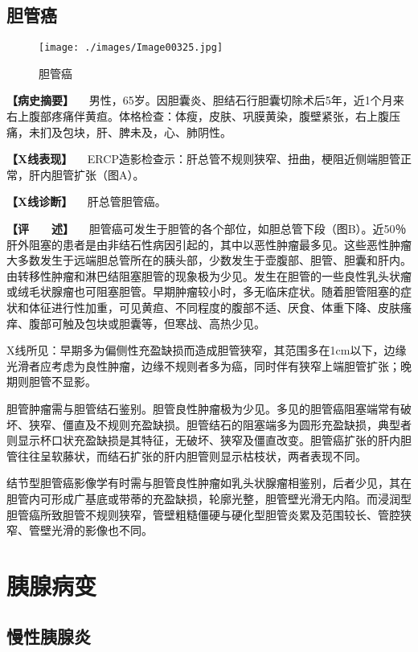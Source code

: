 \subsection{胆管癌}

\begin{figure}[!htbp]
 \centering
 \texttt{[image: ./images/Image00325.jpg]}
 \captionsetup{justification=centering}
 \caption{胆管癌}
 \label{fig5-8-6}
  \end{figure} 

\textbf{【病史摘要】}
　男性，65岁。因胆囊炎、胆结石行胆囊切除术后5年，近1个月来右上腹部疼痛伴黄疸。体格检查：体瘦，皮肤、巩膜黄染，腹壁紧张，右上腹压痛，未扪及包块，肝、脾未及，心、肺阴性。

\textbf{【X线表现】}
　ERCP造影检查示：肝总管不规则狭窄、扭曲，梗阻近侧端胆管正常，肝内胆管扩张（图A）。

\textbf{【X线诊断】} 　肝总管胆管癌。

\textbf{【评　　述】}
　胆管癌可发生于胆管的各个部位，如胆总管下段（图B）。近50％肝外阻塞的患者是由非结石性病因引起的，其中以恶性肿瘤最多见。这些恶性肿瘤大多数发生于远端胆总管所在的胰头部，少数发生于壶腹部、胆管、胆囊和肝内。由转移性肿瘤和淋巴结阻塞胆管的现象极为少见。发生在胆管的一些良性乳头状瘤或绒毛状腺瘤也可阻塞胆管。早期肿瘤较小时，多无临床症状。随着胆管阻塞的症状和体征进行性加重，可见黄疸、不同程度的腹部不适、厌食、体重下降、皮肤瘙痒、腹部可触及包块或胆囊等，但寒战、高热少见。

X线所见：早期多为偏侧性充盈缺损而造成胆管狭窄，其范围多在1cm以下，边缘光滑者应考虑为良性肿瘤，边缘不规则者多为癌，同时伴有狭窄上端胆管扩张；晚期则胆管不显影。

胆管肿瘤需与胆管结石鉴别。胆管良性肿瘤极为少见。多见的胆管癌阻塞端常有破坏、狭窄、僵直及不规则充盈缺损。胆管结石的阻塞端多为圆形充盈缺损，典型者则显示杯口状充盈缺损是其特征，无破坏、狭窄及僵直改变。胆管癌扩张的肝内胆管往往呈软藤状，而结石扩张的肝内胆管则显示枯枝状，两者表现不同。

结节型胆管癌影像学有时需与胆管良性肿瘤如乳头状腺瘤相鉴别，后者少见，其在胆管内可形成广基底或带蒂的充盈缺损，轮廓光整，胆管壁光滑无内陷。而浸润型胆管癌所致胆管不规则狭窄，管壁粗糙僵硬与硬化型胆管炎累及范围较长、管腔狭窄、管壁光滑的影像也不同。

\section{胰腺病变}

\subsection{慢性胰腺炎}


